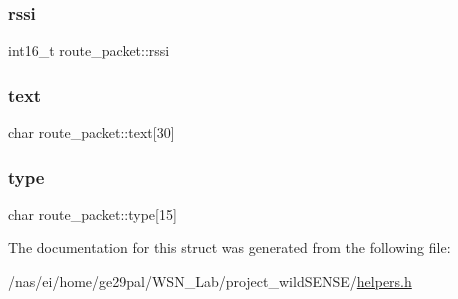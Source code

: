 \mbox{\label{structroute__packet_a639f32eda5987c393538482b2f99435c}} 
\subsubsection{\texorpdfstring{rssi}{rssi}}
{\footnotesize\ttfamily int16\+\_\+t route\+\_\+packet\+::rssi}

\mbox{\label{structroute__packet_a6b864e8792e5751471f877c7efa1a46d}} 
\subsubsection{\texorpdfstring{text}{text}}
{\footnotesize\ttfamily char route\+\_\+packet\+::text\mbox{[}30\mbox{]}}

\mbox{\label{structroute__packet_afd9580ed7894818ee007efeca655f959}} 
\subsubsection{\texorpdfstring{type}{type}}
{\footnotesize\ttfamily char route\+\_\+packet\+::type\mbox{[}15\mbox{]}}



The documentation for this struct was generated from the following file\+:\begin{DoxyCompactItemize}
\item 
/nas/ei/home/ge29pal/\+W\+S\+N\+\_\+\+Lab/project\+\_\+wild\+S\+E\+N\+S\+E/\hyperlink{helpers_8h}{helpers.\+h}\end{DoxyCompactItemize}
